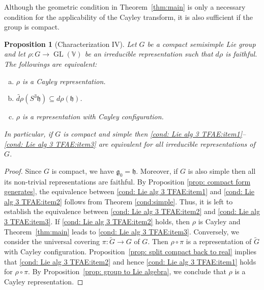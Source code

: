 \documentclass[11pt,reqno]{amsart}
\DeclareMathOperator{\GL}{GL}
\newtheorem{proposition}[theorem]{Proposition}
\begin{document}
Although the geometric condition in Theorem~\ref{thm:main} is only a necessary condition for the applicability of the Cayley transform,  it is also sufficient if the group is compact.
\begin{proposition}[Characterization IV]\label{cond: Lie alg 3 TFAE}
Let $G$ be a compact semisimple Lie group and let $\rho: G \to \GL(\mathbb{V})$ be an irreducible representation such that $d\rho$ is faithful.  The followings are equivalent:
\begin{enumerate}[(a)]
\item $\rho$ is a Cayley representation.  \label{cond: Lie alg 3 TFAE:item1}
\item $ \widetilde{d\rho}\left( S^3 \mathfrak{h} \right) \subseteq d\rho (\mathfrak{h})$.  \label{cond: Lie alg 3 TFAE:item2}
\item $\rho$ is a representation with Cayley configuration.
 \label{cond: Lie alg 3 TFAE:item3}
\end{enumerate}
In particular,  if $G$ is compact and simple then \eqref{cond: Lie alg 3 TFAE:item1}--\eqref{cond: Lie alg 3 TFAE:item3} are equivalent for all irreducible representations of $G$.
\end{proposition}
\begin{proof}
Since $G$ is compact,  we have $\mathfrak{g}_0 = \mathfrak{h}$.  Moreover,  if $G$ is also simple then all its non-trivial representations are faithful.  By Proposition \ref{prop: compact form generates},  the equivalence between \eqref{cond: Lie alg 3 TFAE:item1} and \eqref{cond: Lie alg 3 TFAE:item2} follows from Theorem \ref{cond:simple}.  Thus,  it is left to establish the equivalence between \eqref{cond: Lie alg 3 TFAE:item2} and \eqref{cond: Lie alg 3 TFAE:item3}.  If \eqref{cond: Lie alg 3 TFAE:item2} holds,  then $\rho$ is Cayley and  Theorem~\ref{thm:main} leads to \eqref{cond: Lie alg 3 TFAE:item3}.  Conversely,  {we consider the universal covering $\pi: \widetilde{G}  \to G$ of $G$.  Then $\rho \circ \pi$ is a representation of $\widetilde{G}$ with Cayley configuration.  Proposition~\ref{prop: split compact back to real} implies that \eqref{cond: Lie alg 3 TFAE:item2} and hence \eqref{cond: Lie alg 3 TFAE:item1} holds for $\rho \circ \pi$.  By Proposition~\ref{prop: group to Lie algebra},  we conclude that $\rho$ is a Cayley representation.} 
\end{proof}
\end{document}
